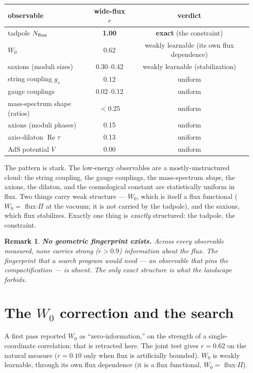 \documentclass[11pt]{article}
\newtheorem{remark}{Remark}
\begin{document}
\begin{center}
\begin{tabular}{lcc}
\toprule
observable & wide-flux $r$ & verdict \\
\midrule
tadpole $N_{\rm flux}$ & \textbf{1.00} & \textbf{exact} (the constraint) \\
$W_0$ & 0.62 & weakly learnable (its own flux dependence) \\
saxions (moduli sizes) & 0.30--0.42 & weakly learnable (stabilization) \\
string coupling $g_s$ & 0.12 & uniform \\
gauge couplings & 0.02--0.12 & uniform \\
mass-spectrum shape (ratios) & $<$0.25 & uniform \\
axions (moduli phases) & 0.15 & uniform \\
axio-dilaton $\operatorname{Re}\tau$ & 0.13 & uniform \\
AdS potential $V$ & 0.00 & uniform \\
\bottomrule
\end{tabular}
\end{center}

The pattern is stark. The low-energy observables are a mostly-unstructured cloud:
the string coupling, the gauge couplings, the mass-spectrum \emph{shape}, the
axions, the dilaton, and the cosmological constant are statistically uniform in
flux. Two things carry weak structure --- $W_0$, which is itself a flux functional
($W_0 = $ flux$\cdot\Pi$ at the vacuum; it is not carried by the tadpole), and the
saxions, which flux stabilizes. Exactly one thing is \emph{exactly} structured: the
tadpole, the constraint.

\begin{remark}
\textbf{No geometric fingerprint exists.} Across every observable measured, none
carries strong ($r>0.9$) information about the flux. The fingerprint that a search
program would need --- an observable that pins the compactification --- is absent.
The only exact structure is what the landscape \emph{forbids}.
\end{remark}

\section{The $W_0$ correction and the search}

A first pass reported $W_0$ as ``zero-information,'' on the strength of a
single-coordinate correlation; that is retracted here. The joint test gives
$r = 0.62$ on the natural measure ($r=0.10$ only when flux is artificially bounded).
$W_0$ is weakly learnable, through its own flux dependence (it is a flux
functional, $W_0 = $ flux$\cdot\Pi$).
\end{document}
